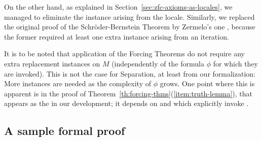 On the other hand, as explained in
Section~\ref{sec:zfc-axioms-as-locales}, we managed to eliminate the
instance arising from the  locale. Similarly,
we replaced the original proof of the Schröder-Bernstein Theorem by
Zermelo's one \cite[Exr. x4.27]{moschovakis1994notes}, because the
former required at least one extra instance
arising from an iteration.

It is to be noted that application of the Forcing Theorems do not
require any extra replacement instances on $M$ (independently of the
formula $\phi$ for which they are invoked). This is not the case for
Separation, at least from our formalization: More instances are needed
as the complexity of $\phi$ grows. One point where this is apparent is
in the proof of Theorem~\ref{th:forcing-thms}(\ref{item:truth-lemma}),
that appears as the  in our development; it
depends on  and
 which explicitly invoke
.

\subsection{A sample formal proof}
\label{sec:sample-formal-proof}

